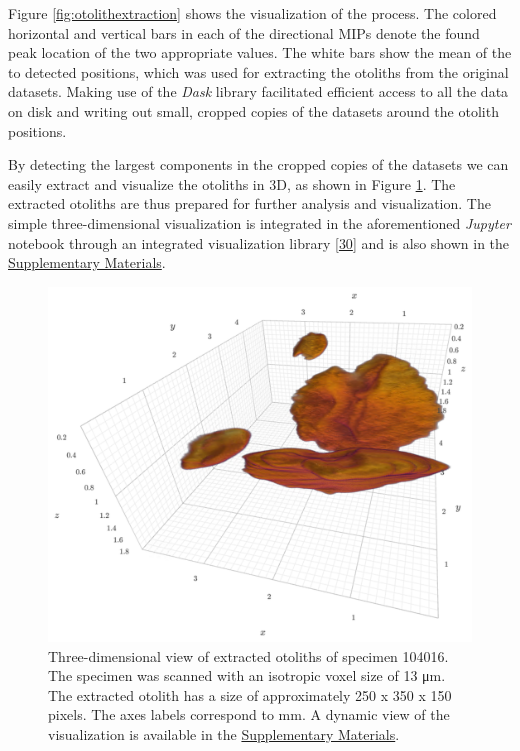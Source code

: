 Figure \ref{fig:otolithextraction} shows the visualization of the process.
The colored horizontal and vertical bars in each of the directional MIPs denote the found peak location of the two appropriate values.
The white bars show the mean of the to detected positions, which was used for extracting the otoliths from the original datasets.
Making use of the \emph{Dask} library facilitated efficient access to all the data on disk and writing out small, cropped copies of the datasets around the otolith positions.

By detecting the largest components in the cropped copies of the datasets we can easily extract and visualize the otoliths in 3D, as shown in Figure \ref{fig:otolith3d}.
The extracted otoliths are thus prepared for further analysis and visualization.
The simple three-dimensional visualization is integrated in the aforementioned \emph{Jupyter} notebook through an integrated visualization library {[}\protect\hyperlink{ref-a9ZL41Of}{30}{]} and is also shown in the \protect\hyperlink{supplementary-materials}{Supplementary Materials}.

\begin{figure}
\hypertarget{fig:otolith3d}{%
\centering
\includegraphics{images/104016.head.rec.otolith.region.3D.png}
\caption{Three-dimensional view of extracted otoliths of specimen 104016.
The specimen was scanned with an isotropic voxel size of 13 μm.
The extracted otolith has a size of approximately 250 x 350 x 150 pixels.
The axes labels correspond to mm.
A dynamic view of the visualization is available in the \protect\hyperlink{supplementary-materials}{Supplementary Materials}.}\label{fig:otolith3d}
}
\end{figure}

